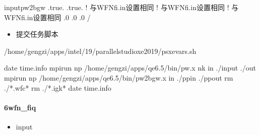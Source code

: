 \documentclass[a4paper,12pt,english]{sphinxmanual}
\begin{document}
\begin{sphinxVerbatim}[commandchars=\\\{\}]
input\PYGZus{}pw2bgw
     
     
     .true.
     
     .true.
                 ! 与WFN\PYGZus{}fi.in设置相同
                 ! 与WFN\PYGZus{}fi.in设置相同
                 ! 与WFN\PYGZus{}fi.in设置相同
     .0
     .0
     .0
/
\end{sphinxVerbatim}
\begin{itemize}
\item {} 
\sphinxAtStartPar
提交任务脚本

\end{itemize}

\begin{sphinxVerbatim}[commandchars=\\\{\}]


 
 /home/gengzi/apps/intel/19/parallel\PYGZus{}studio\PYGZus{}xe\PYGZus{}2019/psxevars.sh

date  \PYGZgt{}\PYGZgt{} time.info
mpirun \PYGZhy{}np  /home/gengzi/apps/qe\PYGZhy{}6.5/bin/pw.x \PYGZhy{}nk   \PYGZhy{}in ./input \PYGZgt{} ./out
mpirun \PYGZhy{}np  /home/gengzi/apps/qe\PYGZhy{}6.5/bin/pw2bgw.x \PYGZhy{}in ./pp\PYGZus{}in \PYGZgt{} ./pp\PYGZus{}out
rm ./*.wfc*
rm ./*.igk*
date  \PYGZgt{}\PYGZgt{} time.info
\end{sphinxVerbatim}


\paragraph{6\sphinxhyphen{}wfn\_fiq}
\label{\detokenize{tutorials/berkeleygw/gw:wfn-fiq}}\begin{itemize}
\item {} 
\sphinxAtStartPar
input

\end{itemize}
\end{document}
